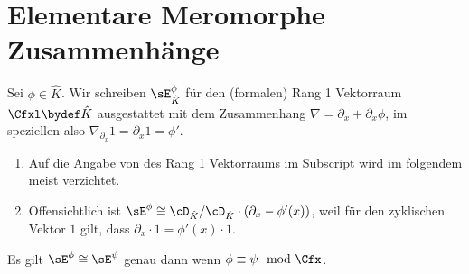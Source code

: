 \chapter{Elementare Meromorphe Zusammenhänge}
\begin{comment}
einführen als Bausteine oder kleinste Meromorphe Zusammenhänge
\end{comment}
\begin{defn}
\cite[1.a]{sabbah_Fourier-local}
Sei $\phi\in\hat K$.
Wir schreiben $\sE_{\hat K}^\phi$ für den (formalen) Rang 1 Vektorraum $\Cfxl
\bydef \hat K$ ausgestattet mit dem Zusammenhang
$\nabla=\partial_x+\partial_x\phi$, im speziellen also
$\nabla_{\partial_x}1=\partial_x1=\phi'$.\\
\begin{comment}
Also
\begin{align*}
\sE^\phi=\Cfxl & \overset{\partial_x}{\rightarrow} \Cfxl\\
1              & \mapsto \phi'(x)\\
f(x)           & \mapsto f'(x)+f(x)\phi'(x)\\
\end{align*}
\end{comment}
\end{defn}
\begin{bem}
\begin{enumerate}
\item Auf die Angabe von des Rang 1 Vektorraums im Subscript wird im folgendem
meist verzichtet.
\item Offensichtlich ist $\sE^\phi\cong\cD_{\hat K}/\cD_{\hat
K}\cdot(\partial_x-\phi'(x))$, weil für den zyklischen Vektor $1$ gilt, dass
$\partial_x \cdot 1 = \phi'(x) \cdot 1$.
\end{enumerate}
\end{bem}

\begin{bem} \label{bem:FormRang1VR}
\cite[1.a]{sabbah_Fourier-local}
Es gilt $\sE^\phi\cong\sE^\psi$ genau dann wenn $\phi\equiv\psi \mod \Cfx$.
\end{bem}

\begin{comment}
ausformulierte version eines beweises im paper sabbah_Fourier-local.pdf zu
lemma 2.4
\end{comment}

